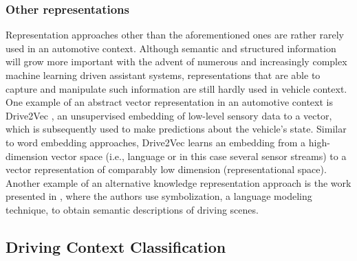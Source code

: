 \subsubsection{Other representations}

Representation approaches other than the aforementioned ones are rather rarely used in an automotive context.
Although semantic and structured information will grow more important with the advent of numerous and increasingly complex machine learning driven assistant systems, representations that are able to capture and manipulate such information are still hardly used in vehicle context.
One example of an abstract vector representation in an automotive context is Drive2Vec \cite{Hallac2018}, an unsupervised embedding of low-level sensory data to a vector, which is subsequently used to make predictions about the vehicle's state.
Similar to word embedding approaches, Drive2Vec learns an embedding from a high-dimension vector space (i.e., language or in this case several sensor streams) to a vector representation of comparably low dimension (representational space).
Another example of an alternative knowledge representation approach is the work presented in \cite{Yamazaki2016}, where the authors use symbolization, a language modeling technique, to obtain semantic descriptions of driving scenes.

\subsection{Driving Context Classification}%
\label{subsec:driving_context_classification}

